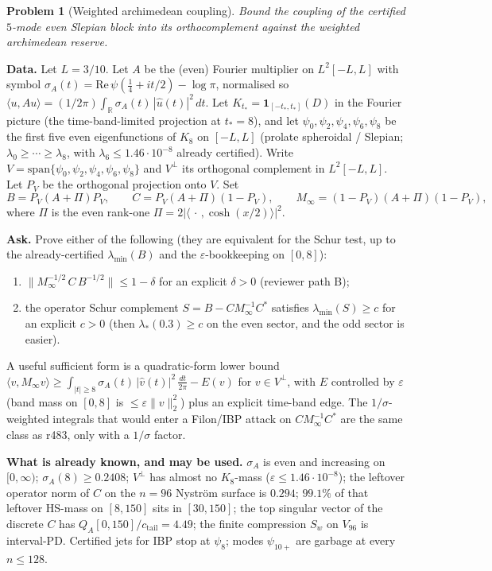 \documentclass[11pt]{article}
\newtheorem{problem}{Problem}
\theoremstyle{remark}
\newcommand{\Minf}{M_{\infty}}
\begin{document}
\begin{problem}[Weighted archimedean coupling]
\label{pr:coupling}
Bound the coupling of the certified $5$-mode even
Slepian block into its orthocomplement against the
weighted archimedean reserve.
\end{problem}

\noindent\textbf{Data.}
Let $L=3/10$.
Let $A$ be the (even) Fourier multiplier on
$L^2[-L,L]$ with symbol
$\sigma_A(t)=\mathrm{Re}\,\psi(\tfrac14+it/2)-\log\pi$,
normalised so
$\langle u,Au\rangle=(1/2\pi)\int_{\mathbb R}\sigma_A(t)\,|\hat u(t)|^2\,dt$.
Let $K_{t_*}=\mathbf{1}_{[-t_*,t_*]}(D)$ in the Fourier
picture (the time-band-limited projection at $t_*=8$),
and let $\psi_0,\psi_2,\psi_4,\psi_6,\psi_8$ be the first
five even eigenfunctions of $K_8$ on $[-L,L]$
(prolate spheroidal / Slepian; $\lambda_0\ge\cdots\ge\lambda_8$,
with $\lambda_6\le1.46\cdot10^{-8}$ already certified).
Write $V=\mathrm{span}\{\psi_0,\psi_2,\psi_4,\psi_6,\psi_8\}$
and $V^\perp$ its orthogonal complement in $L^2[-L,L]$.
Let $P_V$ be the orthogonal projection onto $V$.
Set
\[
  B = P_V(A+\Pi)P_V,\qquad
  C = P_V(A+\Pi)(1-P_V),\qquad
  \Minf = (1-P_V)(A+\Pi)(1-P_V),
\]
where $\Pi$ is the even rank-one
$\Pi=2|\langle\,\cdot\,,\cosh(x/2)\rangle|^2$.

\noindent\textbf{Ask.}
Prove either of the following (they are equivalent
for the Schur test, up to the already-certified
$\lambda_{\min}(B)$ and the $\varepsilon$-bookkeeping
on $[0,8]$):

\begin{enumerate}
\item[\rm(i)]
$\| \Minf^{-1/2}\,C\, B^{-1/2} \| \le 1-\delta$
for an explicit $\delta>0$
(reviewer path B);
\item[\rm(ii)]
the operator Schur complement
$S = B - C\Minf^{-1}C^*$
satisfies $\lambda_{\min}(S)\ge c$ for an explicit
$c>0$
(then $\lambda_*(0.3)\ge c$ on the even sector,
and the odd sector is easier).
\end{enumerate}

A useful sufficient form is a quadratic-form lower
bound
$\langle v,\Minf v\rangle \ge
\int_{|t|\ge8}\sigma_A(t)\,|\hat v(t)|^2\,\frac{dt}{2\pi}
- E(v)$
for $v\in V^\perp$, with $E$ controlled by
$\varepsilon$ (band mass on $[0,8]$ is
$\le\varepsilon\|v\|_2^2$) plus an explicit time-band
edge.  The $1/\sigma$-weighted integrals that would
enter a Filon/IBP attack on $C\Minf^{-1}C^*$ are the
same class as r483, only with a $1/\sigma$ factor.

\noindent\textbf{What is already known, and may be used.}
$\sigma_A$ is even and increasing on $[0,\infty)$;
$\sigma_A(8)\ge0.2408$;
$V^\perp$ has almost no $K_8$-mass
($\varepsilon\le1.46\cdot10^{-8}$);
the leftover operator norm of $C$ on the $n=96$
Nystr\"om surface is $0.294$;
$99.1\%$ of that leftover HS-mass on $[8,150]$ sits
in $[30,150]$;
the top singular vector of the discrete $C$ has
$Q_A[0,150]/c_{\mathrm{tail}}=4.49$;
the finite compression $S_w$ on $V_{96}$ is
interval-PD.
Certified jets for IBP stop at $\psi_8$;
modes $\psi_{10+}$ are garbage at every $n\le128$.
\end{document}
